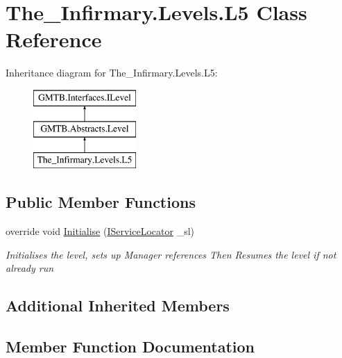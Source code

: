 \hypertarget{class_the___infirmary_1_1_levels_1_1_l5}{}\section{The\+\_\+\+Infirmary.\+Levels.\+L5 Class Reference}
\label{class_the___infirmary_1_1_levels_1_1_l5}
Inheritance diagram for The\+\_\+\+Infirmary.\+Levels.\+L5\+:\begin{figure}[H]
\begin{center}
\leavevmode
\includegraphics[height=3.000000cm]{class_the___infirmary_1_1_levels_1_1_l5}
\end{center}
\end{figure}
\subsection*{Public Member Functions}
\begin{DoxyCompactItemize}
\item 
override void \mbox{\hyperlink{class_the___infirmary_1_1_levels_1_1_l5_ae27f4406b6d74c7634d3f42a26526650}{Initialise}} (\mbox{\hyperlink{interface_g_m_t_b_1_1_interfaces_1_1_i_service_locator}{I\+Service\+Locator}} \+\_\+sl)
\begin{DoxyCompactList}\small\item\em Initialises the level, sets up Manager references Then Resumes the level if not already run \end{DoxyCompactList}\end{DoxyCompactItemize}
\subsection*{Additional Inherited Members}


\subsection{Member Function Documentation}
\mbox{\label{class_the___infirmary_1_1_levels_1_1_l5_ae27f4406b6d74c7634d3f42a26526650}} 
